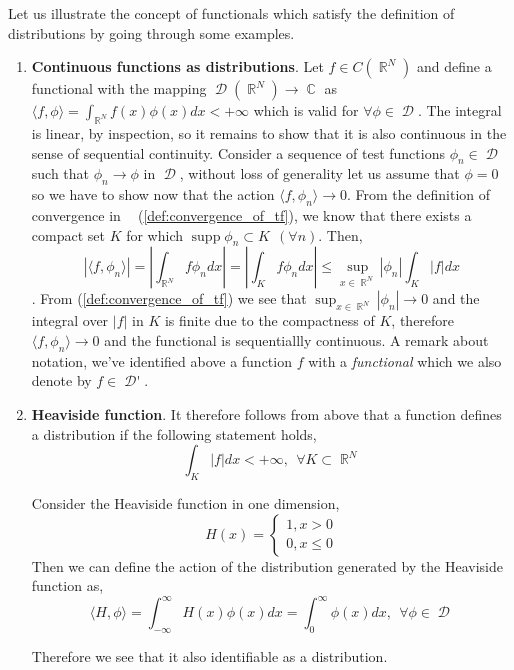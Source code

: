 \documentclass[12pt, a4]{article}
\DeclareMathOperator\supp{supp}
\DeclareMathOperator\reals{\mathbb{R}}
\DeclareMathOperator\complexes{\mathbb{C}}
\DeclareMathOperator\tfspace{C_0^\infty}
\DeclareMathOperator\tfspaceD{\mathcal{D}}
\DeclareMathOperator\dist{\mathcal{D'}}
\begin{document}
Let us illustrate the concept of functionals which satisfy the definition of distributions by going through some examples.

\begin{enumerate}
    \item \textbf{Continuous functions as distributions}. Let $f \in C(\reals^N)$ and define a functional with the mapping $\tfspaceD(\reals^N) \rightarrow \complexes$ as $\langle f, \phi \rangle = \int_{\reals^N} f(x) \phi(x) dx < +\infty$ which is valid for $\forall \phi \in \tfspaceD$. The integral is linear, by inspection, so it remains to show that it is also continuous in the sense of sequential continuity. Consider a sequence of test functions $\phi_n \in \tfspaceD$ such that $\phi_n \rightarrow \phi$ in $\tfspaceD$, without loss of generality let us assume that $\phi = 0$ so we have to show now that the action $\langle f, \phi_n \rangle \rightarrow 0$. From the definition of convergence in $\tfspace$ (\ref{def:convergence_of_tf}), we know that there exists a compact set $K$ for which $\supp \phi_n \subset K \> \> (\forall n)$. Then, \[ |\langle f, \phi_n \rangle | = \left |\int_{\reals^N}f \phi_n dx \right | = \left |\int_K f \phi_n dx \right | \leq \sup_{x \in \reals^N} |\phi_n| \int_K |f| dx\]. From (\ref{def:convergence_of_tf}) we see that $\sup_{x \in \reals^N} |\phi_n| \rightarrow 0$ and the integral over $|f|$ in $K$ is finite due to the compactness of $K$, therefore $\langle f, \phi_n \rangle \rightarrow 0$ and the functional is sequentiallly continuous. A remark about notation, we've identified above a function $f$ with a \textit{functional} which we also denote by $f \in \dist$.
    \item \textbf{Heaviside function}. It therefore follows from above that a function defines a distribution if the following statement holds, \[ \int_K |f| dx < + \infty, \> \> \forall K \subset \reals^N \]

    Consider the Heaviside function in one dimension, \[ H(x) = \begin{cases}
        1, x > 0 \\
        0, x \leq 0
    \end{cases}\]
    Then we can define the action of the distribution generated by the Heaviside function as, \[ \langle H, \phi \rangle = \int_{-\infty}^{\infty} H(x) \phi(x) dx = \int_{0}^{\infty} \phi(x) dx, \> \> \forall \phi \in \tfspaceD \]

    Therefore we see that it also identifiable as a distribution.
\end{enumerate}
\end{document}
